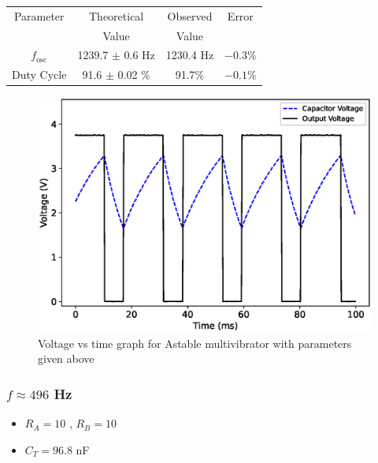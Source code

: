 \begin{table}[H]
    \centering
    \begin{tabular}{|c|c|c|c|}\hline
        Parameter & Theoretical & Observed & Error \\ 
        & Value       & Value    &       \\ \hline 
        $f_\text{osc}$   & 1239.7 $\pm$ 0.6 Hz & 1230.4 Hz & $-0.3\%$  \\ \hline
        Duty Cycle       & 91.6 $\pm$ 0.02 \% & 91.7\%  & $-0.1\%$ \\ \hline
    \end{tabular}
\end{table}
\begin{figure}[H]
    \centering
    \includegraphics[width=0.9\columnwidth]{images/5551.eps}
    \caption{Voltage vs time graph for Astable multivibrator with parameters given above}
\end{figure}

\subsubsection{$f \approx 496$ Hz}
\begin{itemize}
    \item $R_A=10$ \kohm, $R_B=10$ \kohm
    \item $C_T=96.8$ nF
\end{itemize}

